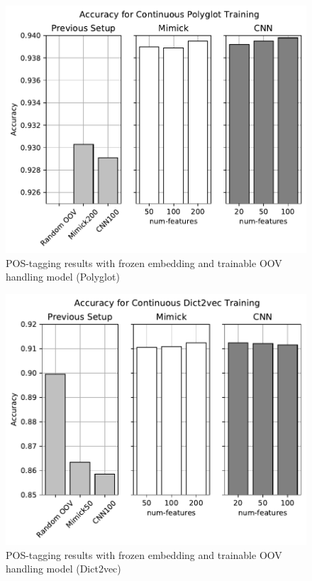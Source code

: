       \begin{figure}[h]
        \centering
        \includegraphics[width=0.8\linewidth]{images/continuous_polyglot.pdf}
        \caption{POS-tagging results with frozen embedding and trainable OOV handling model (Polyglot)}
        \label{fig:postag_polyglot_continuous_results}
      \end{figure}
      \begin{figure}[H]
        \centering
        \includegraphics[width=0.8\linewidth]{images/continuous_dict2vec.pdf}
        \caption{POS-tagging results with frozen embedding and trainable OOV handling model (Dict2vec)}
        \label{fig:postag_dict2vec_continuous_results}
      \end{figure}

